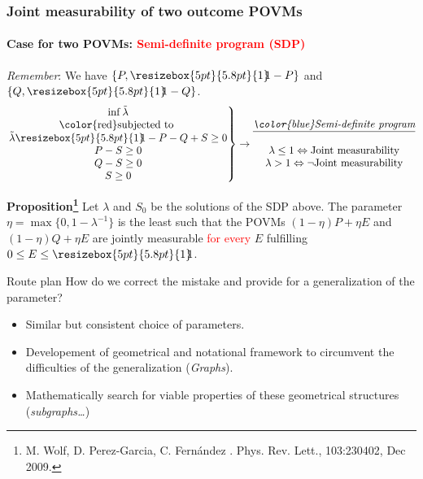 \documentclass[mathserif,handout]{beamer}
\newcommand{\bbone}{\ensuremath{\resizebox{5pt}{5.8pt}{1}\hspace{-3.5pt}1}}
\begin{document}
\begin{frame}
\frametitle{ Joint measurability of two outcome POVMs }
\framesubtitle{Case for two POVMs: \textcolor{red}{Semi-definite program (SDP)}}
\textit{Remember}: We have $\{P, \bbone - P\}$ and $\{Q, \bbone - Q\}$. 
$$\left .
\begin{matrix}
\inf\tilde \lambda \\
\mbox{\color{red}subjected to }\\
\tilde\lambda\bbone - P - Q + S \geq 0 \\
P - S \geq 0 \\
Q -S \geq 0 \\
S\geq 0 
\end{matrix}
\right \} \rightarrow 
\begin{matrix}
\mbox{\underline{\it \color{blue}Semi-definite program}}\\
\\
 \lambda \leq 1 \Leftrightarrow \mbox{Joint measurability} \\
 \lambda > 1 \Leftrightarrow \neg\mbox{Joint measurability} 
\end{matrix}
$$


\begin{alertblock}{\bf Proposition\footnote{\tiny M. Wolf, D. Perez-Garcia, C. Fern\'{a}ndez . Phys. Rev. Lett., 103:230402, Dec 2009.}}
Let $\lambda $ and $S_{0}$ be the solutions of the SDP above. The parameter $\eta = \max\{0, 1 - \lambda^{-1}\}$ is the least such that the POVMs $(1-\eta) P + \eta E$ and $(1-\eta) Q + \eta E$ are jointly measurable \textcolor{red}{for every} $E$ fulfilling $0\leq E\leq \bbone$. 
\end{alertblock}


\end{frame}


\begin{frame}{Route plan}
How do we correct the mistake and provide for a generalization of the parameter? 
\begin{itemize}
\item Similar but consistent choice of parameters.
\item Developement of geometrical and notational framework to circumvent the difficulties of the generalization (\textit{Graphs}).
\item Mathematically search for viable properties of these geometrical structures (\textit{subgraphs\ldots})
\end{itemize}

\end{frame}
\end{document}
